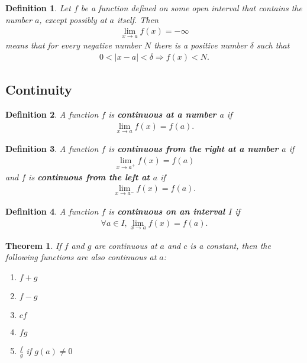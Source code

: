 \documentclass{article}
\theoremstyle{sltheorem}
\newtheorem{definition}{Definition}[section]
\newtheorem{theorem}{Theorem}[section]
\begin{document}
\begin{definition}
    Let $f$ be a function defined on some open interval that contains the number $a$, except possibly at $a$ itself. Then
    \begin{align*}
        \lim_{x\to a}f(x) = -\infty
    \end{align*} 
    means that for every negative number $N$ there is a positive number $\delta$ such that
    \begin{align*}
        0<|x-a|<\delta \Rightarrow f(x)<N.
    \end{align*}
\end{definition}
\subsection{Continuity}
\begin{definition}
    A function $f$ is \textbf{continuous at a number $a$} if
    \begin{align*}
        \lim_{x\to a}f(x)=f(a).
    \end{align*}
\end{definition}
\begin{definition}
    A function $f$ is \textbf{continuous from the right at a number $a$} if
    \begin{align*}
        \lim_{x\to a^+}f(x) = f(a)
    \end{align*}
    and $f$ is \textbf{continuous from the left at $a$} if
    \begin{align*}
        \lim_{x\to a^-}f(x) = f(a).
    \end{align*}
\end{definition}
\begin{definition}
    A function $f$ is \textbf{continuous on an interval $I$} if 
    \begin{align*}
        \forall a \in I, \lim_{x\to a}f(x) = f(a).
    \end{align*}
\end{definition}
\begin{theorem}
    If $f$ and $g$ are continuous at $a$ and $c$ is a constant, then the following functions are also continuous at $a$:
    \begin{enumerate}
        \item $f+g$
        \item $f-g$
        \item $cf$
        \item $fg$
        \item $\frac{f}{g}$ if $g(a)\not= 0$
    \end{enumerate}
\end{theorem}
\end{document}
